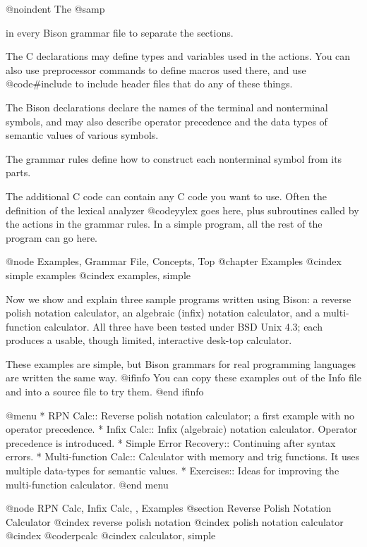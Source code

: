 @noindent
The @samp{%
in every Bison grammar file to separate the sections.

The C declarations may define types and variables used in the actions.
You can also use preprocessor commands to define macros used there, and use
@code{#include} to include header files that do any of these things.

The Bison declarations declare the names of the terminal and nonterminal
symbols, and may also describe operator precedence and the data types of
semantic values of various symbols.

The grammar rules define how to construct each nonterminal symbol from its
parts.

The additional C code can contain any C code you want to use.  Often the
definition of the lexical analyzer @code{yylex} goes here, plus subroutines
called by the actions in the grammar rules.  In a simple program, all the
rest of the program can go here.

@node Examples, Grammar File, Concepts, Top
@chapter Examples
@cindex simple examples
@cindex examples, simple

Now we show and explain three sample programs written using Bison: a
reverse polish notation calculator, an algebraic (infix) notation
calculator, and a multi-function calculator.  All three have been tested
under BSD Unix 4.3; each produces a usable, though limited, interactive
desk-top calculator.

These examples are simple, but Bison grammars for real programming
languages are written the same way.
@ifinfo
You can copy these examples out of the Info file and into a source file
to try them.
@end ifinfo

@menu
* RPN Calc::          Reverse polish notation calculator;
                        a first example with no operator precedence.
* Infix Calc::        Infix (algebraic) notation calculator.
                        Operator precedence is introduced.
* Simple Error Recovery::  Continuing after syntax errors.
* Multi-function Calc::  Calculator with memory and trig functions.
                           It uses multiple data-types for semantic values.
* Exercises::         Ideas for improving the multi-function calculator.
@end menu

@node RPN Calc, Infix Calc,  , Examples
@section Reverse Polish Notation Calculator
@cindex reverse polish notation
@cindex polish notation calculator
@cindex @code{rpcalc}
@cindex calculator, simple

}
